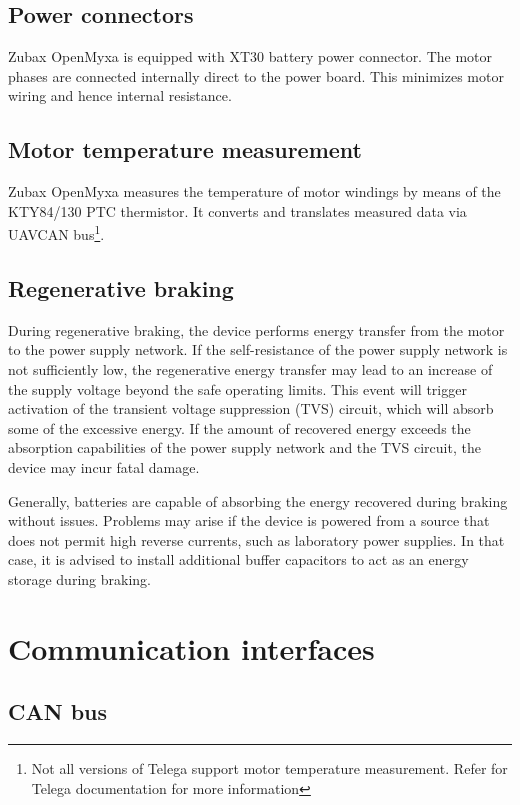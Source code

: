 \documentclass{zubaxdoc}
\begin{document}
\subsection{Power connectors}

Zubax OpenMyxa is equipped with XT30 battery power connector. 
The motor phases are connected internally direct to the power board. This minimizes motor wiring and hence internal resistance. 

\subsection{Motor temperature measurement}

Zubax OpenMyxa measures the temperature of motor windings by means of the KTY84/130 PTC  thermistor. It converts 
and translates measured data via UAVCAN bus\footnote{Not all versions of Telega support motor temperature measurement. 
Refer for Telega documentation for more information}.  

\subsection{Regenerative braking}

During regenerative braking, the device performs energy transfer from the motor to the power supply network.
If the self-resistance of the power supply network is not sufficiently low,
the regenerative energy transfer may lead to an increase of the supply voltage beyond
the safe operating limits.
This event will trigger activation of the transient voltage suppression (TVS) circuit,
which will absorb some of the excessive energy.
If the amount of recovered energy exceeds the absorption capabilities of the power supply
network and the TVS circuit, the device may incur fatal damage.

Generally, batteries are capable of absorbing the energy recovered during braking without issues.
Problems may arise if the device is powered from a source that does not permit high reverse currents,
such as laboratory power supplies.
In that case, it is advised to install additional buffer capacitors to act as an energy storage
during braking.

\section{Communication interfaces}

\subsection{CAN bus}
\end{document}
